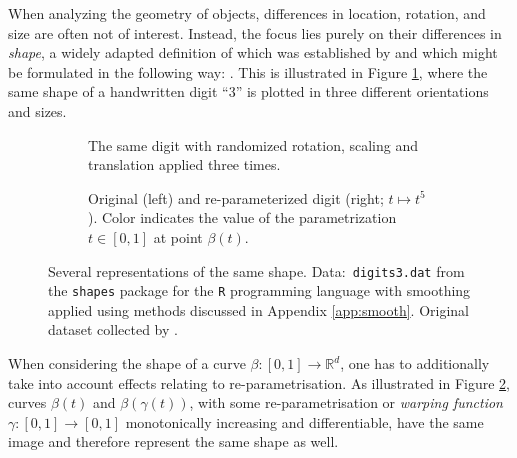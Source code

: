 When analyzing the geometry of objects, differences in location, rotation, and size are often not of interest.
Instead, the focus lies purely on their differences in  \textit{shape}, a widely adapted definition of which was established by \cite{Kendall1977} and which might be formulated in the following way: .
This is illustrated in Figure \ref{fig:1-eucl}, where the same shape of a handwritten digit \enquote{3} is plotted in three different orientations and sizes.
\begin{figure}
  \centering
  \begin{subfigure}{.48\textwidth}
    \centering
    \caption{The same digit with randomized rotation, scaling and translation applied three times.\\}
    \label{fig:1-eucl}
  \end{subfigure}\hfill%
  \begin{subfigure}{.48\textwidth}
    \centering
    \caption{Original (left) and re-parameterized digit (right; $t \mapsto t^5$). Color indicates the value of the parametrization $t \in [0,1]$ at point $\beta(t)$.}
    \label{fig:1-warp}
  \end{subfigure}
  \caption{Several representations of the same shape. Data:\ \texttt{digits3.dat} from the \texttt{shapes} package \parencite{shapes} for the \texttt{R} programming language \parencite{R} with smoothing applied using methods discussed in Appendix \ref{app:smooth}. Original dataset collected by \cite{Anderson1997}.}
  \label{fig:1-shape}
\end{figure}
When considering the shape of a curve $\beta : [0,1] \rightarrow \mathbb{R}^d$, one has to additionally take into account effects relating to re-parametrisation.
As illustrated in Figure \ref{fig:1-warp}, curves $\beta(t)$ and $\beta(\gamma(t))$, with some re-parametrisation or \textit{warping function} $\gamma : [0,1] \rightarrow [0,1]$ monotonically increasing and differentiable, have the same image and therefore represent the same shape as well.

